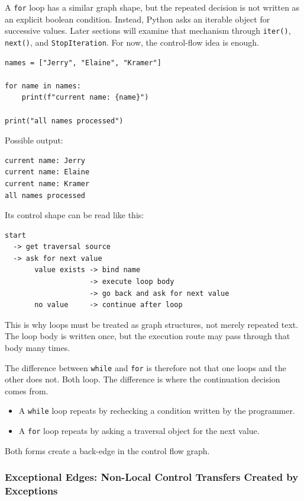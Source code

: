 A \texttt{for} loop has a similar graph shape, but the repeated decision is not written as an explicit boolean condition. Instead, Python asks an iterable object for successive values. Later sections will examine that mechanism through \texttt{iter()}, \texttt{next()}, and \texttt{StopIteration}. For now, the control-flow idea is enough.

\begin{verbatim}
names = ["Jerry", "Elaine", "Kramer"]

for name in names:
    print(f"current name: {name}")

print("all names processed")
\end{verbatim}

Possible output:

\begin{verbatim}
current name: Jerry
current name: Elaine
current name: Kramer
all names processed
\end{verbatim}

Its control shape can be read like this:

\begin{verbatim}
start
  -> get traversal source
  -> ask for next value
       value exists -> bind name
                    -> execute loop body
                    -> go back and ask for next value
       no value     -> continue after loop
\end{verbatim}

This is why loops must be treated as graph structures, not merely repeated text. The loop body is written once, but the execution route may pass through that body many times.

The difference between \texttt{while} and \texttt{for} is therefore not that one loops and the other does not. Both loop. The difference is where the continuation decision comes from.

\begin{itemize}
    \item A \texttt{while} loop repeats by rechecking a condition written by the programmer.
    \item A \texttt{for} loop repeats by asking a traversal object for the next value.
\end{itemize}

Both forms create a back-edge in the control flow graph.

\subsubsection{Exceptional Edges: Non-Local Control Transfers Created by Exceptions}


